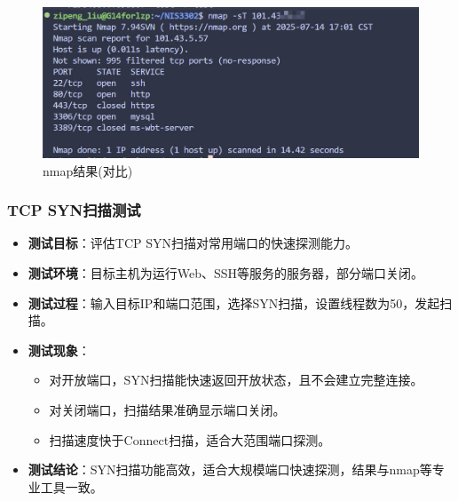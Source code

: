 \documentclass[12pt,hyperref,a4paper,UTF8]{ctexart}
\begin{document}
\begin{figure}[!htbp]
    \centering
    \includegraphics[width =.8\textwidth]{figures/nmap.jpg}
    \caption{nmap结果(对比)}
    \label{SJTU}
\end{figure}

\subsubsection{TCP SYN扫描测试}
\begin{itemize}
    \item \textbf{测试目标}：评估TCP SYN扫描对常用端口的快速探测能力。
    \item \textbf{测试环境}：目标主机为运行Web、SSH等服务的服务器，部分端口关闭。
    \item \textbf{测试过程}：输入目标IP和端口范围，选择SYN扫描，设置线程数为50，发起扫描。
    \item \textbf{测试现象}：
        \begin{itemize}
            \item 对开放端口，SYN扫描能快速返回开放状态，且不会建立完整连接。
            \item 对关闭端口，扫描结果准确显示端口关闭。
            \item 扫描速度快于Connect扫描，适合大范围端口探测。
        \end{itemize}
    \item \textbf{测试结论}：SYN扫描功能高效，适合大规模端口快速探测，结果与nmap等专业工具一致。
\end{itemize}
\end{document}

